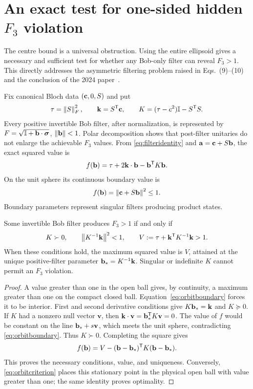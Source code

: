 \section{An exact test for one-sided hidden \texorpdfstring{$F_3$}{F3} violation}\label{sec:orbit}
The centre bound is a universal obstruction. Using the entire ellipsoid gives
a necessary and sufficient test for whether any Bob-only filter can reveal
$F_3>1$. This directly addresses the asymmetric filtering problem raised
in Eqs.~(9)--(10) and the conclusion of the 2024 paper~\cite{ducuara}.

Fix canonical Bloch data $(\mathbf c,0,S)$ and put
\begin{equation}\label{eq:orbitdefs}
\tau=\left\lVert S\right\rVert_F^2,\qquad \mathbf k=S^{\mathsf T}\mathbf c,\qquad
K=(\tau-c^2)\mathbb I-S^{\mathsf T}S.
\end{equation}
Every positive invertible Bob filter, after normalization, is represented by
$F=\sqrt{\mathbb I+\mathbf b\cdot\boldsymbol\sigma}$, $\left\lVert\mathbf b\right\rVert<1$. Polar decomposition shows that
post-filter unitaries do not enlarge the achievable $F_3$ values. From
\eqref{eq:filteridentity} and $\mathbf a=\mathbf c+S\mathbf b$, the exact squared value is
\begin{equation}\label{eq:orbitquadratic}
f(\mathbf b)=\tau+2\mathbf k\cdot\mathbf b-\mathbf b^{\mathsf T}K\mathbf b.
\end{equation}
On the unit sphere its continuous boundary value is
\begin{equation}\label{eq:orbitboundary}
f(\mathbf b)=\left\lVert\mathbf c+S\mathbf b\right\rVert^2\leq1.
\end{equation}
Boundary parameters represent singular filters producing product states.

\begin{theorem}\label{thm:orbit}
Some invertible Bob filter produces $F_3>1$ if and only if
\begin{equation}\label{eq:orbitcriterion}
K\succ0,\qquad \left\lVert K^{-1}\mathbf k\right\rVert^2<1,\qquad
V:=\tau+\mathbf k^{\mathsf T}K^{-1}\mathbf k>1.
\end{equation}
When these conditions hold, the maximum squared value is $V$, attained at
the unique positive-filter parameter $\mathbf b_*=K^{-1}\mathbf k$.
Singular or indefinite $K$ cannot permit an $F_3$ violation.
\end{theorem}
\begin{proof}
A value greater than one in the open ball gives, by continuity, a maximum
greater than one on the compact closed ball. Equation~\eqref{eq:orbitboundary}
forces it to be interior. First and second derivative conditions give
$K\mathbf b_*=\mathbf k$ and $K\succeq0$.
If $K$ had a nonzero null vector $\mathbf v$, then
$\mathbf k\cdot\mathbf v=\mathbf b_*^{\mathsf T}K\mathbf v=0$.
The value of $f$ would be constant on the line $\mathbf b_*+s\mathbf v$, which
meets the unit sphere, contradicting \eqref{eq:orbitboundary}.
Thus $K\succ0$. Completing the square gives
\[
f(\mathbf b)=V-(\mathbf b-\mathbf b_*)^{\mathsf T}K(\mathbf b-\mathbf b_*).
\]
This proves the necessary conditions, value, and uniqueness. Conversely,
\eqref{eq:orbitcriterion} places this stationary point in the physical
open ball with value greater than one; the same identity proves optimality.
\end{proof}

